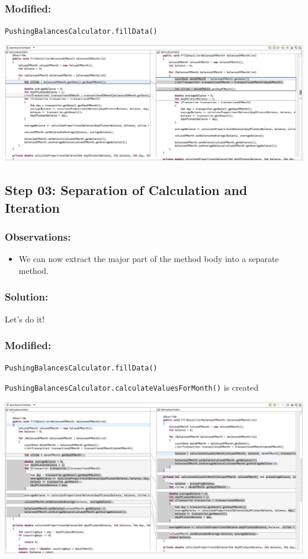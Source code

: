 \documentclass[a4paper,fleqn,titlepage,11pt]{article}
\begin{document}
\subsubsection*{Modified:}

\texttt{PushingBalancesCalculator.fillData()}

\includegraphics[width=1\textwidth]{CompareViews/01-02.jpg}


\subsection*{Step 03: Separation of Calculation and Iteration}

\subsubsection*{Observations:}
\begin{itemize}
\item We can now extract the major part of the method body into a separate method.
\end{itemize}

\subsubsection*{Solution:}

Let's do it!

\subsubsection*{Modified:}

\texttt{PushingBalancesCalculator.fillData()}

\texttt{PushingBalancesCalculator.calculateValuesForMonth()} is created

\includegraphics[width=1\textwidth]{CompareViews/02-03.jpg}
\end{document}
